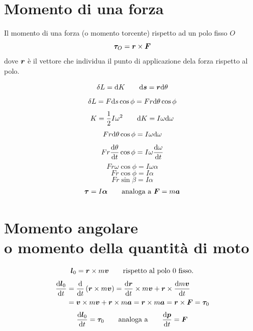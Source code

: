 \section{Momento di una forza}
\begin{Def}
Il momento di una forza (o momento torcente) rispetto ad un polo fisso $O$
 \begin{equation}
  \boldsymbol{\tau}_O=\boldsymbol{r} \times \boldsymbol{F}
 \end{equation}
dove $\boldsymbol{r}$ è il vettore che individua il punto di applicazione dela forza rispetto al polo.
\end{Def}
\begin{equation*}\delta L=\mathrm{d} K\qquad \mathrm{d} \boldsymbol{s}=\boldsymbol{r}\mathrm{d} \theta\end{equation*}
\begin{equation*}\delta L=F\mathrm{d} s\cos \phi=Fr\mathrm{d}\theta\cos\phi\end{equation*}
\begin{equation*}K=\frac{1}{2}I\omega^2\qquad\mathrm{d} K=I\omega\mathrm{d}\omega\end{equation*}
\begin{equation*}Fr\mathrm{d}\theta\cos\phi=I\omega\mathrm{d}\omega\end{equation*}
$$Fr\frac{\mathrm{d}\theta}{\mathrm{d} t}\cos\phi=I\omega\frac{\mathrm{d}\omega}{\mathrm{d}
t}$$
\begin{equation*}Fr\omega\cos\phi=I\omega\alpha\end{equation*}
\begin{equation*}Fr\cos\phi=I\alpha\end{equation*}
\begin{equation*}Fr\sin\beta=I\alpha\end{equation*}
\begin{equation*}\boldsymbol{\tau}=I\boldsymbol{\alpha}\qquad\text{analoga a $\boldsymbol{F}=m\boldsymbol{a}$}\end{equation*}
\section[\index{momento!angolare}\index{momento!della quantità di moto}Momento angolare o della quantità di moto]{Momento angolare\\ o momento della quantità di moto}
\begin{equation*}\boldsymbol{l}_0=\boldsymbol{r}\times m\boldsymbol{v}\qquad\text{rispetto al polo $0$ fisso.}\end{equation*}
\begin{align*}
\frac{\mathrm{d} \boldsymbol{l}_0}{\mathrm{d} t}&=\frac{\mathrm{d}}{\mathrm{d} t}\left(\boldsymbol{r}\times m\boldsymbol{v}\right)= \frac{\mathrm{d}\boldsymbol{r}}{\mathrm{d} t}\times m\boldsymbol{v}+\boldsymbol{r}\times\frac{\mathrm{d} m\boldsymbol{v}}{\mathrm{d} t}\\
&=\boldsymbol{v}\times m\boldsymbol{v}+\boldsymbol{r} \times m\boldsymbol{a}=\boldsymbol{r}\times m\boldsymbol{a}=\boldsymbol{r}\times\boldsymbol{F}=\boldsymbol{\tau}_0
\end{align*}
$$\frac{\mathrm{d}\boldsymbol{l}_0}{\mathrm{d} t}=\boldsymbol{\tau}_0\qquad\text{analoga
a}\qquad\frac{\mathrm{d} \boldsymbol{p}}{\mathrm{d} t}=\boldsymbol{F}$$
